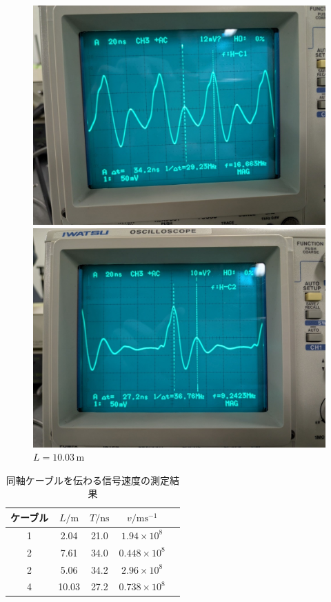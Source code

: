 \documentclass{jarticle}
\begin{document}
\begin{figure}[H]
  \centering
  \begin{minipage}[b]{0.49\columnwidth}
    \centering
    \includegraphics[scale=0.15]{cable3_result_picture.jpg}
    \caption{$L=5.06\,\mathrm{m}$}
  \end{minipage}
  \begin{minipage}[b]{0.49\columnwidth}
    \centering
    \includegraphics[scale=0.15]{cable4_result_picture.jpg}
    \caption{$L=10.03\,\mathrm{m}$}
  \end{minipage}
\end{figure}

\begin{table}[h]
  \centering
  \caption{同軸ケーブルを伝わる信号速度の測定結果}
  \begin{tabular}{ccccc}
    \hline
    ケーブル & $L/\mathrm{m}$ & $T/\mathrm{ns}$ & $v/\mathrm{ms^{-1}}$ \\
    \hline
    1 & 2.04 & 21.0 & $1.94\times10^8$ \\
    2 & 7.61 & 34.0 & $0.448\times10^8$ \\
    2 & 5.06 & 34.2 & $2.96\times10^8$ \\
    4 & 10.03 & 27.2 & $0.738\times10^8$ \\
    \hline
  \end{tabular}
\end{table}
\end{document}
